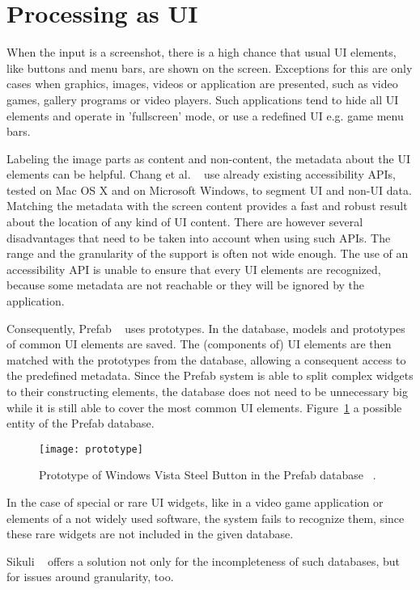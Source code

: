 \documentclass[draft,final]{vutinfth} %
\begin{document}
	\section{Processing as UI}
	When the input is a screenshot, there is a high chance that usual UI elements, like buttons and menu bars, are shown on the screen.
	Exceptions for this are only cases when graphics, images, videos or application are presented, such as video games, gallery programs or video players.
	Such applications tend to hide all UI elements and operate in 'fullscreen' mode, or use a redefined UI e.g. game menu bars.\par
	Labeling the image parts as content and non-content, the metadata about the UI elements can be helpful.
	Chang et al. ~\cite{chang2011associating} use already existing accessibility APIs, tested on Mac OS X and on Microsoft Windows, to segment UI and non-UI data. 
	Matching the metadata with the screen content provides a fast and robust result about the location of any kind of UI content.
	There are however several disadvantages that need to be taken into account when using such APIs.
	The range and the granularity of the support is often not wide enough.
	The use of an accessibility API is unable to ensure that every UI elements are recognized, because some metadata are not reachable or they will be ignored by the application.\par
	Consequently, Prefab ~\cite{dixon2010prefab} uses prototypes. 
	In the database, models and  prototypes of common UI elements are saved.
	The (components of) UI elements are then matched with the prototypes from the database, allowing a consequent access to the predefined metadata.
	Since the Prefab system is able to split complex widgets to their constructing elements, the database does not need to be unnecessary big while it is still able to cover the most common UI elements.
	Figure~\ref{fig:prototype} a possible entity of the Prefab database.
	\begin{figure}[H]
		\centering		
		\texttt{[image: prototype]}
		\caption{Prototype of Windows Vista Steel Button in the Prefab database ~\cite{dixon2010prefab}.}
		\label{fig:prototype}
	\end{figure} 
	In the case of special or rare UI widgets, like in a video game application or elements of a not widely used software, the system fails to recognize them, since these rare widgets are not included in the given database.\par
	Sikuli ~\cite{yeh2009sikuli} offers a solution not only for the incompleteness of such databases, but for issues around granularity, too.
\end{document}
